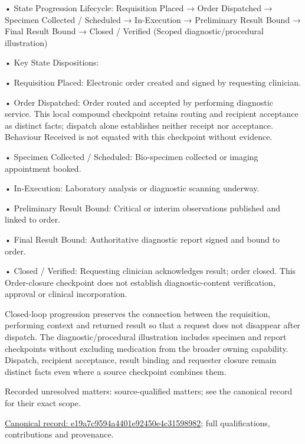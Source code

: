 •
State Progression Lifecycle: Requisition Placed → Order Dispatched → Specimen Collected / Scheduled → In-Execution → Preliminary Result Bound → Final Result Bound → Closed / Verified   (Scoped diagnostic/procedural illustration)



•
Key State Dispositions:



•
Requisition Placed: Electronic order created and signed by requesting clinician.



•
Order Dispatched: Order routed and accepted by performing diagnostic service. This local compound checkpoint retains routing and recipient acceptance as distinct facts; dispatch alone establishes neither receipt nor acceptance. Behaviour Received is not equated with this checkpoint without evidence.



•
Specimen Collected / Scheduled: Bio-specimen collected or imaging appointment booked.



•
In-Execution: Laboratory analysis or diagnostic scanning underway.



•
Preliminary Result Bound: Critical or interim observations published and linked to order.



•
Final Result Bound: Authoritative diagnostic report signed and bound to order.



•
Closed / Verified: Requesting clinician acknowledges result; order closed. This Order-closure checkpoint does not establish diagnostic-content verification, approval or clinical incorporation.



Closed-loop progression preserves the connection between the requisition, performing context and returned result so that a request does not disappear after dispatch. The diagnostic/procedural illustration includes specimen and report checkpoints without excluding medication from the broader owning capability. Dispatch, recipient acceptance, result binding and requester closure remain distinct facts even where a source checkpoint combines them.


{\small Recorded unresolved matters: source-qualified matters; see the canonical record for their exact scope.}\par
{\footnotesize \href{../../../../continuum/business/business-process/e19a7c9594a4401e92450e4c31598982.md}{Canonical record: e19a7c9594a4401e92450e4c31598982}; full qualifications, contributions and provenance.}\par
